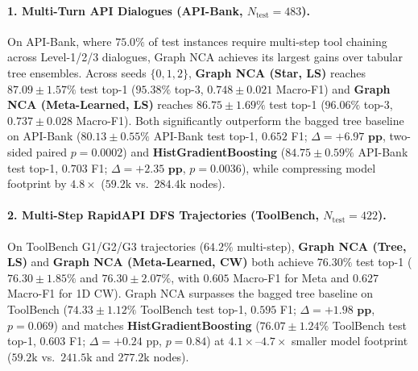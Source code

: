 \documentclass[10pt,twocolumn,letterpaper]{article}
\begin{document}
\paragraph{1. Multi-Turn API Dialogues (API-Bank, $N_{\text{test}}=483$).}
On API-Bank, where $75.0\%$ of test instances require multi-step tool chaining across Level-1/2/3 dialogues, Graph NCA achieves its largest gains over tabular tree ensembles. Across seeds $\{0,1,2\}$, \textbf{Graph NCA (Star, LS)} reaches $\mathbf{87.09 \pm 1.57\%}$ test top-1 ($95.38\%$ top-3, $\mathbf{0.748 \pm 0.021}$ Macro-F1) and \textbf{Graph NCA (Meta-Learned, LS)} reaches $\mathbf{86.75 \pm 1.69\%}$ test top-1 ($96.06\%$ top-3, $0.737 \pm 0.028$ Macro-F1). Both significantly outperform the bagged tree baseline on API-Bank ($80.13 \pm 0.55\%$ API-Bank test top-1, $0.652$ F1; $\Delta = \mathbf{+6.97\text{ pp}}$, two-sided paired $p = 0.0002$) and \textbf{HistGradientBoosting} ($84.75 \pm 0.59\%$ API-Bank test top-1, $0.703$ F1; $\Delta = \mathbf{+2.35\text{ pp}}$, $p = 0.0036$), while compressing model footprint by $4.8\times$ ($59.2\text{k}$ vs.\ $284.4\text{k}$ nodes).

\paragraph{2. Multi-Step RapidAPI DFS Trajectories (ToolBench, $N_{\text{test}}=422$).}
On ToolBench G1/G2/G3 trajectories ($64.2\%$ multi-step), \textbf{Graph NCA (Tree, LS)} and \textbf{Graph NCA (Meta-Learned, CW)} both achieve $\mathbf{76.30\%}$ test top-1 ($76.30 \pm 1.85\%$ and $76.30 \pm 2.07\%$, with $0.605$ Macro-F1 for Meta and $0.627$ Macro-F1 for 1D CW). Graph NCA surpasses the bagged tree baseline on ToolBench ($74.33 \pm 1.12\%$ ToolBench test top-1, $0.595$ F1; $\Delta = \mathbf{+1.98\text{ pp}}$, $p = 0.069$) and matches \textbf{HistGradientBoosting} ($76.07 \pm 1.24\%$ ToolBench test top-1, $0.603$ F1; $\Delta = +0.24\text{ pp}$, $p = 0.84$) at $4.1\times$--$4.7\times$ smaller model footprint ($59.2\text{k}$ vs.\ $241.5\text{k}$ and $277.2\text{k}$ nodes).
\end{document}
